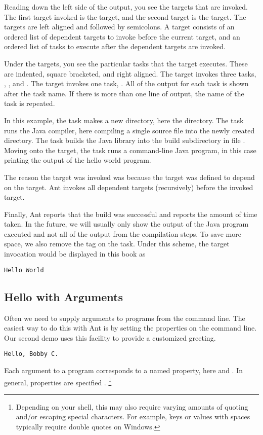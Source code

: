 Reading down the left side of the output, you see the targets that are
invoked.  The first target invoked is the  target, and the
second target is the  target.  The targets are left aligned
and followed by semicolons.  A target consists of an ordered list of
dependent targets to invoke before the current target, and an ordered
list of tasks to execute after the dependent targets are invoked.

Under the targets, you see the particular tasks that the target
executes.  These are indented, square bracketed, and right aligned.
The  target invokes three tasks, , ,
and .  The  target invokes one task, .
All of the output for each task is shown after the task name.  If
there is more than one line of output, the name of the task is
repeated.

In this example, the  task makes a new directory, here the 
 directory.  The  task runs the
Java compiler, here compiling a single source file into the
newly created directory.  The  task builds the Java
library into the build subdirectory  in file
.  Moving onto the  target,
the  task runs a command-line Java program, in this
case printing the output of the hello world program.

The reason the  target was invoked was because the
 target was defined to depend on the  target.
Ant invokes all dependent targets (recursively) before the invoked
target.

Finally, Ant reports that the build was successful and reports the
amount of time taken.  In the future, we will usually only show the
output of the Java program executed and not all of the output from the
compilation steps.  To save more space, we also remove the
\code{[java]} tag on the task.  Under this scheme, the 
target invocation would be displayed in this book as
%
\begin{verbatim}
Hello World
\end{verbatim}

\subsection{Hello with Arguments}

Often we need to supply arguments to programs from the command
line.  The easiest way to do this with Ant is by setting the
properties on the command line.  Our second demo uses this facility
to provide a customized greeting.
%
\begin{verbatim}
Hello, Bobby C.
\end{verbatim}
%
Each argument to a program corresponds to a named property, here
 and .  In general, properties are specified
.%
%
\footnote{Depending on your shell, this may also require varying
  amounts of quoting and/or escaping special characters.  For example,
  keys or values with spaces typically require double quotes on
  Windows.}



